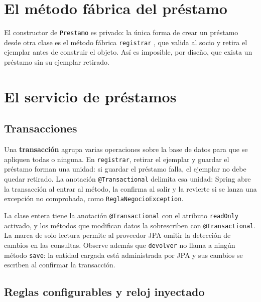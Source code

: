 \section{El método fábrica del préstamo}



El constructor de \texttt{Prestamo} es privado: la única forma de crear un préstamo desde otra clase es el método fábrica \texttt{registrar} \cite{gamma1994design}, que valida al socio y retira el ejemplar antes de construir el objeto. Así es imposible, por diseño, que exista un préstamo sin su ejemplar retirado.

\section{El servicio de préstamos}



\subsection{Transacciones}

Una \textbf{transacción} agrupa varias operaciones sobre la base de datos para que se apliquen todas o ninguna. En \texttt{registrar}, retirar el ejemplar y guardar el préstamo forman una unidad: si guardar el préstamo falla, el ejemplar no debe quedar retirado. La anotación \texttt{@Transactional} delimita esa unidad: Spring abre la transacción al entrar al método, la confirma al salir y la revierte si se lanza una excepción no comprobada, como \texttt{ReglaNegocioException}.

La clase entera tiene la anotación \texttt{@Transactional} con el atributo \texttt{readOnly} activado, y los métodos que modifican datos la sobrescriben con \texttt{@Transactional}. La marca de solo lectura permite al proveedor JPA omitir la detección de cambios en las consultas. Observe además que \texttt{devolver} no llama a ningún método \texttt{save}: la entidad cargada está administrada por JPA y sus cambios se escriben al confirmar la transacción.

\subsection{Reglas configurables y reloj inyectado}

